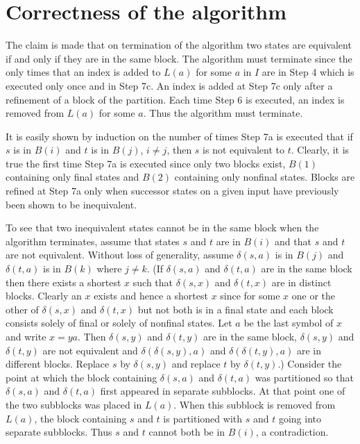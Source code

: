 \section{Correctness of the algorithm}

The claim is made that on termination of the algorithm two states are equivalent if and only if they are
in the same block. The algorithm must terminate since the only times that an index is added to $L(a)$ for
some $a$ in $I$ are in Step 4 which is executed only once and in Step 7c. An index is added at Step 7c only
after a refinement of a block of the partition. Each time Step 6 is executed, an index is removed from $L(a)$
for some $a$. Thus the algorithm must terminate.

It is easily shown by induction on the number of times Step 7a is executed that if $s$ is in $B(i)$ and
$t$ is in $B(j)$, $i \neq j$, then $s$ is not equivalent to $t$. Clearly, it is true the first time Step 7a is
executed since only two blocks exist, $B(1)$ containing only final states and $B(2)$ containing only nonfinal
states. Blocks are refined at Step 7a only when successor states on a given input have previously been
shown to be inequivalent.

To see that two inequivalent states cannot be in the same block when the algorithm terminates, assume
that states $s$ and $t$ are in $B(i)$ and that $s$ and $t$ are not equivalent. Without loss of generality,
assume $\delta (s, a)$ is in $B(j)$ and $\delta (t, a)$ is in $B(k)$ where $j \neq k$. (If $\delta (s, a)$ and $\delta (t, a)$ are in the
same block then there exists a shortest $x$ such that $\delta (s, x)$ and $\delta (t, x)$ are in distinct blocks. Clearly
an $x$ exists and hence a shortest $x$ since for some $x$ one or the other of $\delta (s, x)$ and $\delta (t, x)$ but not
both is in a final state and each block consists solely of final or solely of nonfinal states. Let $a$ be the
last symbol of $x$ and write $x = ya$. Then $\delta (s, y)$ and $\delta (t, y)$ are in the same block, $\delta (s, y)$ and $\delta (t, y)$
are not equivalent and $\delta (\delta (s, y), a)$ and $\delta (\delta (t, y), a)$ are in different blocks. Replace $s$ by $\delta (s, y)$ and
replace $t$ by $\delta (t, y)$.) Consider the point at which the block containing $\delta (s, a)$ and $\delta (t, a)$ was
partitioned so that $\delta (s, a)$ and $\delta (t, a)$ first appeared in separate subblocks. At that point one of the
two subblocks was placed in $L(a)$. When this subblock is removed from $L(a)$, the block containing $s$ and
$t$ is partitioned with $s$ and $t$ going into separate subblocks. Thus $s$ and $t$ cannot both be in $B(i)$,
a contradiction.
